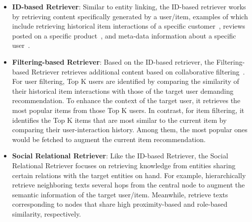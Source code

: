 \begin{itemize}[leftmargin=*]
    \item \textbf{ID-based Retriever}: Similar to entity linking, the ID-based retriever works by retrieving content specifically generated by a user/item, examples of which include retrieving historical item interactions of a specific customer~\cite{zeng2024large, jiang2023social, zeng2024federated}, reviews posted on a specific product~\cite{xie2023factual}, and meta-data information about a specific user~\cite{wu2024stark, salemi2023lamp}.

    \item \textbf{Filtering-based Retriever}: Based on the ID-based retriever, the Filtering-based Retriever retrieves additional content based on collaborative filtering~\cite{wang2023zero}. For user filtering, Top K users are identified by comparing the similarity of their historical item interactions with those of the target user demanding recommendation. To enhance the context of the target user, it retrieves the most popular items from those Top K users. In contrast, for item filtering, it identifies the Top K items that are most similar to the current item by comparing their user-interaction history. Among them, the most popular ones would be fetched to augment the current item recommendation.


    \item \textbf{Social Relational Retriever}: Like the ID-based Retriever, the Social Relational Retriever focuses on retrieving knowledge from entities sharing certain relations with the target entities on hand. For example, \citet{du2024large} hierarchically retrieve neighboring texts several hops from the central node to augment the semantic information of the target user/item. Meanwhile, \citet{wang2024augmenting} retrieve texts corresponding to nodes that share high proximity-based and role-based similarity, respectively.
    

\end{itemize}
